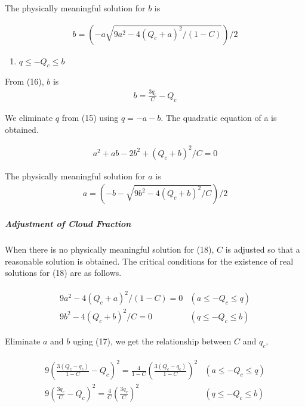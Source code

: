 The physically meaningful solution for \(b\) is

\begin{eqnarray}
b=\left(-a\sqrt{9 a^{2}-4\left(Q_{c}+a\right)^{2} /(1-C)}\right) / 2
\label{E08-18}
\end{eqnarray}

\begin{enumerate}
\def\labelenumi{\arabic{enumi}.}
\setcounter{enumi}{1}
\tightlist
\item
  \(q \leq-Q_{c} \leq b\)
\end{enumerate}

From (16), \(b\) is \begin{eqnarray}
b=\frac{3 q_{c}}{C}-Q_{c}
\end{eqnarray}

We eliminate \(q\) from (15) using \(q = -a-b\). The quadratic equation
of a is obtained.

\begin{eqnarray}
a^{2}+ab-2 b^{2}+\left(Q_{c}+b\right)^{2} / C=0
\label{E08-17}
\end{eqnarray}

The physically meaningful solution for \(a\) is \begin{eqnarray}
a=\left(-b-\sqrt{9 b^{2}-4\left(Q_{c}+b\right)^{2} / C}\right) / 2
\label{E08-18}
\end{eqnarray}

\hypertarget{adjustment-of-cloud-fraction}{%
\subparagraph{Adjustment of Cloud
Fraction}\label{adjustment-of-cloud-fraction}}

When there is no physically meaningful solution for (18), \(C\) is
adjusted so that a reasonable solution is obtained. The critical
conditions for the existence of real solutions for (18) are as follows.

\begin{eqnarray}
\begin{array}{ll}
9 a^{2}-4\left(Q_{c}+a\right)^{2} /(1-C)=0 & \left(a \leq-Q_{c} \leq q\right) \\
9 b^{2}-4\left(Q_{c}+b\right)^{2} / C=0 & \left(q \leq-Q_{c} \leq b\right)
\end{array}
\end{eqnarray}

Eliminate \(a\) and \(b\) uging (17), we get the relationship between
\(C\) and \(q_c\),

\begin{eqnarray}
\begin{array}{ll}
9\left(\frac{3\left(Q_{c}-q_{c}\right)}{1-C}-Q_{c}\right)^{2}=\frac{4}{1-C}\left(\frac{3\left(Q_{c}-q_{c}\right)}{1-C}\right)^{2} & \left(a \leq-Q_{c} \leq q\right) \\
9\left(\frac{3 q_{c}}{C}-Q_{c}\right)^{2}=\frac{4}{C}\left(\frac{3 q_{c}}{C}\right)^{2} & \left(q \leq-Q_{c} \leq b\right)
\end{array}
\end{eqnarray}

